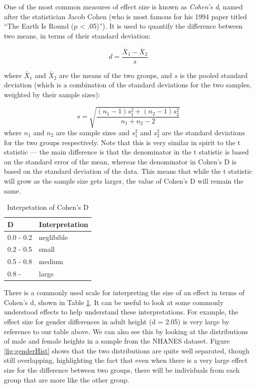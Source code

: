 \documentclass[
  12pt,
]{book}
\begin{document}
One of the most common measures of effect size is known as \emph{Cohen's d}, named after the statistician Jacob Cohen (who is most famous for his 1994 paper titled ``The Earth Is Round (p \textless{} .05)''). It is used to quantify the difference between two means, in terms of their standard deviation:

\[
d = \frac{\bar{X}_1 - \bar{X}_2}{s}
\]

where \(\bar{X}_1\) and \(\bar{X}_2\) are the means of the two groups, and \(s\) is the pooled standard deviation (which is a combination of the standard deviations for the two samples, weighted by their sample sizes):

\[
s = \sqrt{\frac{(n_1 - 1)s^2_1 + (n_2 - 1)s^2_2 }{n_1 +n_2 -2}}
\]
where \(n_1\) and \(n_2\) are the sample sizes and \(s^2_1\) and \(s^2_2\) are the standard deviations for the two groups respectively. Note that this is very similar in spirit to the t statistic --- the main difference is that the denominator in the t statistic is based on the standard error of the mean, whereas the denominator in Cohen's D is based on the standard deviation of the data. This means that while the t statistic will grow as the sample size gets larger, the value of Cohen's D will remain the same.

\begin{table}

\caption{\label{tab:dInterp}Interpetation of Cohen's D}
\centering
\begin{tabular}[t]{l|l}
\hline
D & Interpretation\\
\hline
0.0 - 0.2 & neglibible\\
\hline
0.2 - 0.5 & small\\
\hline
0.5 - 0.8 & medium\\
\hline
0.8 - & large\\
\hline
\end{tabular}
\end{table}

There is a commonly used scale for interpreting the size of an effect in terms of Cohen's d, shown in Table \ref{tab:dInterp}. It can be useful to look at some commonly understood effects to help understand these interpretations. For example, the effect size for gender differences in adult height (d = 2.05) is very large by reference to our table above. We can also see this by looking at the distributions of male and female heights in a sample from the NHANES dataset. Figure \ref{fig:genderHist} shows that the two distributions are quite well separated, though still overlapping, highlighting the fact that even when there is a very large effect size for the difference between two groups, there will be individuals from each group that are more like the other group.
\end{document}
